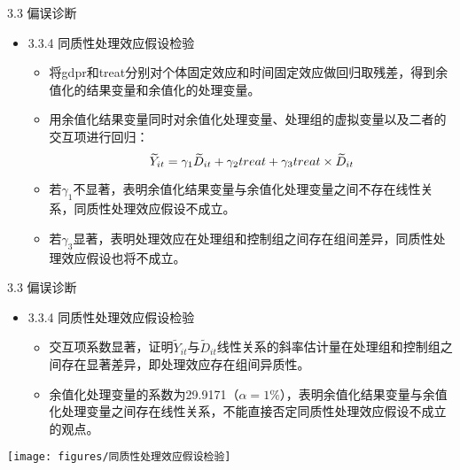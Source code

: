 \documentclass{beamer}%
\begin{document}
\begin{frame}[t]{\large 3.3 偏误诊断}
\begin{itemize}
  \item 3.3.4 同质性处理效应假设检验
 \begin{itemize}
  \item 将gdpr和treat分别对个体固定效应和时间固定效应做回归取残差，得到余值化的结果变量和余值化的处理变量。
  \item 用余值化结果变量同时对余值化处理变量、处理组的虚拟变量以及二者的交互项进行回归：
      \begin{equation}
  \setlength{\abovedisplayskip}{2pt}
  \setlength{\belowdisplayskip}{2pt}
      \widetilde{Y}_{it}=\gamma_1 \widetilde{D}_{it}+\gamma_2 treat+\gamma_3 treat \times \widetilde{D}_{it}
      \end{equation}
  \item 若$\gamma_1$不显著，表明余值化结果变量与余值化处理变量之间不存在线性关系，同质性处理效应假设不成立。
  \item 若$\gamma_3$显著，表明处理效应在处理组和控制组之间存在组间差异，同质性处理效应假设也将不成立。
  \end{itemize}
\end{itemize}
\end{frame}


\begin{frame}[t]{\large 3.3 偏误诊断}
\begin{itemize}
  \item 3.3.4 同质性处理效应假设检验
  \begin{itemize}
  \item 交互项系数显著，证明$\widetilde{Y}_{it}$与$\widetilde{D}_{it}$线性关系的斜率估计量在处理组和控制组之间存在显著差异，即处理效应存在组间异质性。
  \item 余值化处理变量的系数为29.9171（$\alpha=1\%$），表明余值化结果变量与余值化处理变量之间存在线性关系，不能直接否定同质性处理效应假设不成立的观点。
  \end{itemize}
\end{itemize}
\vspace{-0.4cm} %
\begin{center}
	\texttt{[image: figures/同质性处理效应假设检验]}
\end{center}
\end{frame}
\end{document}
